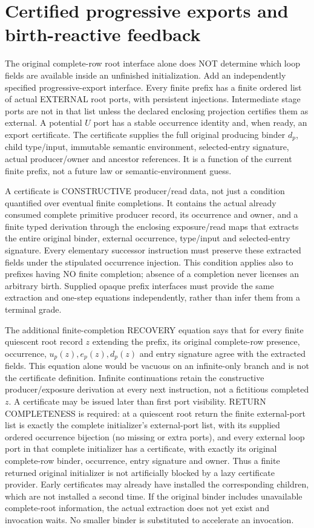 \documentclass[11pt]{article}
\begin{document}
\section{Certified progressive exports and birth-reactive feedback}
The original complete-row root interface alone does NOT determine which loop fields are available inside an unfinished initialization. Add an independently specified progressive-export interface. Every finite prefix has a finite ordered list of actual EXTERNAL root ports, with persistent injections. Intermediate stage ports are not in that list unless the declared enclosing projection certifies them as external. A potential $U$ port has a stable occurrence identity and, when ready, an export certificate. The certificate supplies the full original producing binder $d_p$, child type/input, immutable semantic environment, selected-entry signature, actual producer/owner and ancestor references. It is a function of the current finite prefix, not a future law or semantic-environment guess.

A certificate is CONSTRUCTIVE producer/read data, not just a condition quantified over eventual finite completions. It contains the actual already consumed complete primitive producer record, its occurrence and owner, and a finite typed derivation through the enclosing exposure/read maps that extracts the entire original binder, external occurrence, type/input and selected-entry signature. Every elementary successor instruction must preserve these extracted fields under the stipulated occurrence injection. This condition applies also to prefixes having NO finite completion; absence of a completion never licenses an arbitrary birth. Supplied opaque prefix interfaces must provide the same extraction and one-step equations independently, rather than infer them from a terminal grade.

The additional finite-completion RECOVERY equation says that for every finite quiescent root record $z$ extending the prefix, its original complete-row presence, occurrence, $u_p(z),e_p(z),d_p(z)$ and entry signature agree with the extracted fields. This equation alone would be vacuous on an infinite-only branch and is not the certificate definition. Infinite continuations retain the constructive producer/exposure derivation at every next instruction, not a fictitious completed $z$. A certificate may be issued later than first port visibility. RETURN COMPLETENESS is required: at a quiescent root return the finite external-port list is exactly the complete initializer's external-port list, with its supplied ordered occurrence bijection (no missing or extra ports), and every external loop port in that complete initializer has a certificate, with exactly its original complete-row binder, occurrence, entry signature and owner. Thus a finite returned original initializer is not artificially blocked by a lazy certificate provider. Early certificates may already have installed the corresponding children, which are not installed a second time. If the original binder includes unavailable complete-root information, the actual extraction does not yet exist and invocation waits. No smaller binder is substituted to accelerate an invocation.
\end{document}
